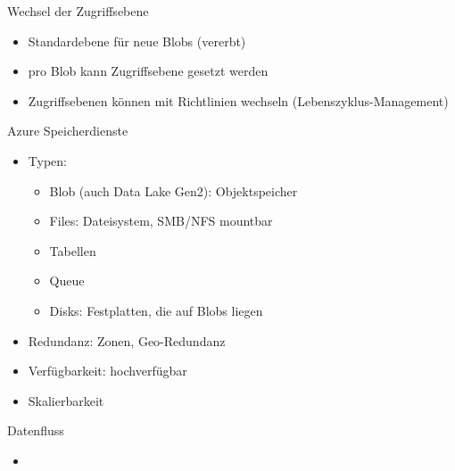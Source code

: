 \begin{flashcard}[Definition]{Wechsel der Zugriffsebene}
  \begin{itemize}
    \item Standardebene für neue Blobs (vererbt)
    \item pro Blob kann Zugriffsebene gesetzt werden
    \item Zugriffsebenen können mit Richtlinien wechseln (Lebenszyklus-Management)
  \end{itemize}
\end{flashcard}
 

\begin{flashcard}[Definition]{Azure Speicherdienste}
  \begin{itemize}
    \item Typen:
      \begin{itemize}
        \item Blob (auch Data Lake Gen2): Objektspeicher
        \item Files: Dateisystem, SMB/NFS mountbar
        \item Tabellen
        \item Queue
        \item Disks: Festplatten, die auf Blobs liegen
      \end{itemize}
    \item Redundanz: Zonen, Geo-Redundanz
    \item Verfügbarkeit: hochverfügbar
    \item Skalierbarkeit
  \end{itemize}
\end{flashcard}


\begin{flashcard}[Definition]{Datenfluss}
  \begin{itemize}
    \item 
  \end{itemize}
\end{flashcard}
